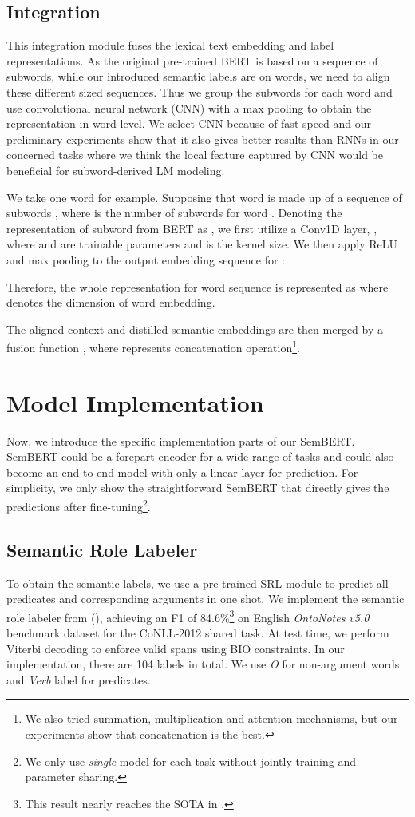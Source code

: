 \documentclass[letterpaper]{article} \usepackage{aaai20}  \usepackage{times}  \usepackage{helvet} \usepackage{courier}  \usepackage[hyphens]{url}  \usepackage{graphicx} \urlstyle{rm} \def\UrlFont{\rm}  \usepackage{graphicx}  \frenchspacing  \usepackage{amssymb}
\begin{document}
\subsection{Integration} 

This integration module fuses the lexical text embedding and label representations. As the original pre-trained BERT is based on a sequence of subwords, while our introduced semantic labels are on words, we need to align these different sized sequences. Thus we group the subwords for each word and use convolutional neural network (CNN) with a max pooling to obtain the representation in word-level. We select CNN because of fast speed and our preliminary experiments show that it also gives better results than RNNs in our concerned tasks where we think the local feature captured by CNN would be beneficial for subword-derived LM modeling. 

We take one word for example. Supposing that word  is made up of a sequence of subwords , where  is the number of subwords for word . Denoting the representation of subword  from BERT as , we first utilize a Conv1D layer, ,
where  and  are trainable parameters and  is the kernel size. We then apply ReLU and max pooling to the output embedding sequence for :

Therefore, the whole representation for word sequence  is represented as  where  denotes the dimension of word embedding.

The aligned context and distilled semantic embeddings are then merged by a fusion function , where  represents concatenation operation\footnote{We also tried summation, multiplication and attention mechanisms, but our experiments show that concatenation is the best.}.

\section{Model Implementation}\label{sec:imp}
Now, we introduce the specific implementation parts of our SemBERT. SemBERT could be a forepart encoder for a wide range of tasks and could also become an end-to-end model with only a linear layer for prediction. For simplicity, we only show the straightforward SemBERT that directly gives the predictions after fine-tuning\footnote{We only use \emph{single} model for each task without jointly training and parameter sharing.}. 

\subsection{Semantic Role Labeler}\label{srl}
To obtain the semantic labels, we use a pre-trained SRL module to predict all predicates and corresponding arguments in one shot. We implement the semantic role labeler from \citeauthor{Peters2018ELMO} (\citeyear{Peters2018ELMO}), achieving an F1 of 84.6\%\footnote{This result nearly reaches the SOTA in \cite{He2018Jointly}.} on English \emph{OntoNotes v5.0} benchmark dataset \cite{pradhan2013towards} for the CoNLL-2012 shared task. At test time, we perform Viterbi decoding to enforce valid spans using BIO constraints. In our implementation, there are 104 labels in total. We use \emph{O} for non-argument words and \emph{Verb} label for predicates.
\end{document}
